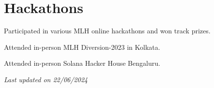 \documentclass[a4paper,11pt]{article}
\begin{document}
\section{Hackathons}
\begin{description}[font=$\bullet$]
\item {\normalsize Participated in various MLH online hackathons and won track prizes.}
\vspace{-5pt}
\item {\normalsize Attended in-person MLH Diversion-2023 in Kolkata.}
\vspace{-5pt}
\item {\normalsize Attended in-person Solana Hacker House Bengaluru.}
\vspace{-5pt}
\end{description}
\vspace{-5pt}
{\hfill \textit{Last updated on 22/06/2024}}
\end{document}
